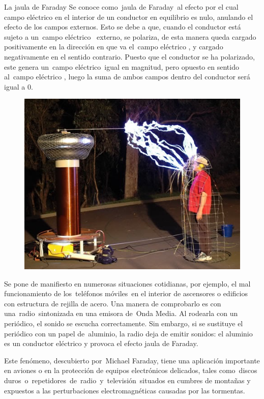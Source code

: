 \newpage %

\begin{myblock}{La jaula de Faraday}
\vspace{2mm} Se conoce como jaula de Faraday al efecto por el cual campo eléctrico en el interior de un conductor en equilibrio es nulo, anulando el efecto de los campos externos. Esto se debe a que, cuando el conductor está sujeto a un campo eléctrico  externo, se polariza, de esta manera queda cargado positivamente en la dirección en que va el campo eléctrico , y cargado negativamente en el sentido contrario. Puesto que el conductor se ha polarizado, este genera un campo eléctrico igual en magnitud, pero opuesto en sentido al campo eléctrico , luego la suma de ambos campos dentro del conductor será igual a $0$.

\begin{figure}[H]
	\centering
	\includegraphics[width=.75\textwidth]{imagenes/imagenes24/T24IM16.png}
\end{figure}

\vspace{2mm} Se pone de manifiesto en numerosas situaciones cotidianas, por ejemplo, el mal funcionamiento de los teléfonos móviles en el interior de ascensores o edificios con estructura de rejilla de acero. Una manera de comprobarlo es con una radio sintonizada en una emisora de Onda Media. Al rodearla con un periódico, el sonido se escucha correctamente. Sin embargo, si se sustituye el periódico con un papel de aluminio, la radio deja de emitir sonidos: el aluminio es un conductor eléctrico y provoca el efecto jaula de Faraday.

\vspace{2mm} Este fenómeno, descubierto por Michael Faraday, tiene una aplicación importante en aviones o en la protección de equipos electrónicos delicados, tales como discos duros o repetidores de radio y televisión situados en cumbres de montañas y expuestos a las perturbaciones electromagnéticas causadas por las tormentas.
\end{myblock}



